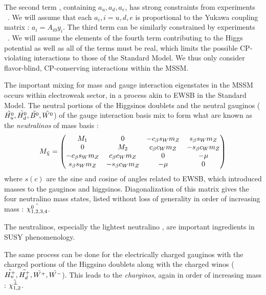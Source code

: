 The second term , containing $a_u,a_d,a_e$, has strong constraints from experiments ~\cite{Hisano:1995nq,Gabbiani:1996hi}.
We will assume that each $a_i, i = u,d,e$ is proportional to the Yukawa coupling matrix : $a_i = A_{i0} y_i$.
The third term  can be similarly constrained by experiments ~\cite{ Dimopoulos:1981zb, Gabbiani:1988rb, Hagelin:1992tc, Hagelin:1994id, Choudhury:1994pn, Barbieri:1994pv, deCarlos:1995ah, Casas:1996de,  Gabbiani:1996hi}.
We will assume the elements of the fourth term  contributing to the Higgs potential as well as all of the  terms must be real, which limits the possible CP-violating interactions to those of the Standard Model.
We thus only consider flavor-blind, CP-conserving interactions within the MSSM.

The important mixing for mass and gauge interaction eigenstates in the MSSM occurs within electroweak sector, in a process akin to EWSB in the Standard Model.
The neutral portions of the Higgsinos doublets and the neutral gauginos ($\tilde{H^0_u}, \tilde{H^0_d} ,\tilde{B^0}, \tilde{W^0}$) of the gauge interaction basis mix to form what are known as the \textit{neutralinos} of mass basis :
\begin{equation}
M_{\tilde{\chi}}=
\begin{pmatrix}
M_1              & 0                & -c_\beta s_W m_Z & s_\beta s_W m_Z  \\
0                & M_2              & c_\beta c_W m_Z  & -s_\beta c_W m_Z \\
-c_\beta s_W m_Z & c_\beta c_W m_Z  & 0                & -\mu             \\
s_\beta s_W m_Z  & -s_\beta c_W m_Z & -\mu             & 0                \\
\end{pmatrix}
\end{equation}
where $s (c)$ are the sine and cosine of angles related to EWSB, which introduced masses to the gauginos and higgsinos.
Diagonalization of this matrix gives the four neutralino mass states, listed without loss of generality in order of increasing mass : $\tilde{\chi^0_{1,2,3,4}}$.

The neutralinos, especially the lightest neutralino \lsp, are important ingredients in SUSY phenomenology.

The same process can be done for the electrically charged gauginos with the charged portions of the Higgsino doublets along with the charged winos ($\tilde{H^+_u}, \tilde{H^+_d}, \tilde{W^+}, \tilde{W^-}$).
This leads to the \textit{charginos}, again in order of increasing mass : $\tilde{\chi_{1,2}^\pm}$.

